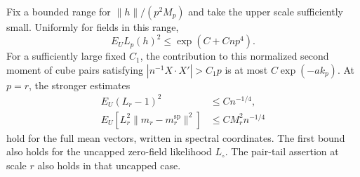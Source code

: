 \begin{lemma}\label{lem:observations-replicas}
Fix a bounded range for $\|h\|/(p^2M_p)$ and take the upper scale
sufficiently small. Uniformly for fields in this range,
\begin{equation}\label{eq:source-9}
 E_U L_p(h)^2\le \exp(C+Cnp^4).
\end{equation}
For a sufficiently large fixed $C_1$, the contribution to this normalized
second moment of cube pairs satisfying
$|n^{-1}X\cdot X'|>C_1p$ is at most $C\exp(-a k_p)$.
At $p=r$, the stronger estimates
\begin{equation}\label{eq:source-10}
 \begin{split}
 E_U(L_r-1)^2&\le Cn^{-1/4},\\
 E_U\!\left[L_r^2\|m_r-m_r^{\mathrm{sp}}\|^2\right]
 &\le C M_r^2 n^{-1/4}
 \end{split}
\end{equation}
hold for the full mean vectors, written in spectral coordinates. The first
bound also holds for the uncapped zero-field likelihood $L_\circ$.
The pair-tail assertion at scale $r$ also holds in that uncapped case.
\end{lemma}

